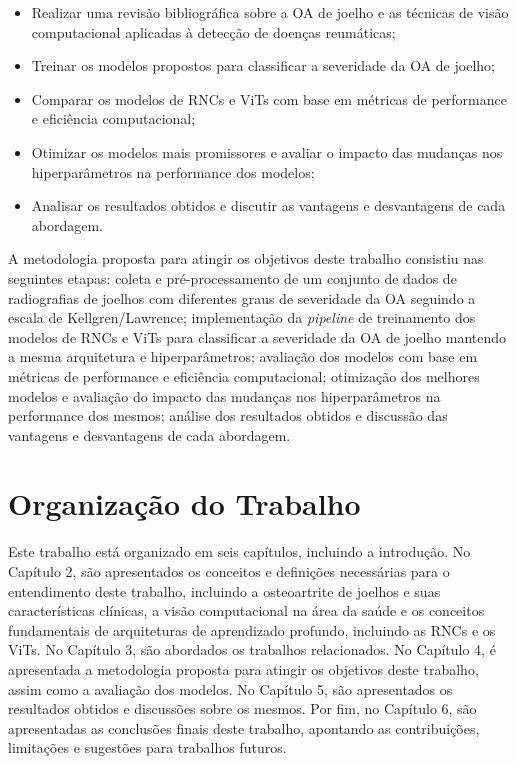\begin{itemize}
    \item Realizar uma revisão bibliográfica sobre a OA de joelho e as técnicas de visão computacional aplicadas à detecção de doenças reumáticas;
    \item Treinar os modelos propostos para classificar a severidade da OA de joelho;
    \item Comparar os modelos de RNCs e ViTs com base em métricas de performance e eficiência computacional;
    \item Otimizar os modelos mais promissores e avaliar o impacto das mudanças nos hiperparâmetros na performance dos modelos;
    \item Analisar os resultados obtidos e discutir as vantagens e desvantagens de cada abordagem.
\end{itemize}

A metodologia proposta para atingir os objetivos deste trabalho consistiu nas seguintes etapas: coleta e pré-processamento de um conjunto de dados de radiografias de joelhos com diferentes graus de severidade da OA seguindo a escala de Kellgren/Lawrence; implementação da \textit{pipeline} de treinamento dos modelos de RNCs e ViTs para classificar a severidade da OA de joelho mantendo a mesma arquitetura e hiperparâmetros; avaliação dos modelos com base em métricas de performance e eficiência computacional; otimização dos melhores modelos e avaliação do impacto das mudanças nos hiperparâmetros na performance dos mesmos; análise dos resultados obtidos e discussão das vantagens e desvantagens de cada abordagem.

\section{Organização do Trabalho}

Este trabalho está organizado em seis capítulos, incluindo a introdução. No Capítulo 2, são apresentados os conceitos e definições necessárias para o entendimento deste trabalho, incluindo a osteoartrite de joelhos e suas características clínicas, a visão computacional na área da saúde e os conceitos fundamentais de arquiteturas de aprendizado profundo, incluindo as RNCs e os ViTs. No Capítulo 3, são abordados os trabalhos relacionados. No Capítulo 4, é apresentada a metodologia proposta para atingir os objetivos deste trabalho, assim como a avaliação dos modelos. No Capítulo 5, são apresentados os resultados obtidos e discussões sobre os mesmos. Por fim, no Capítulo 6, são apresentadas as conclusões finais deste trabalho, apontando as contribuições, limitações e sugestões para trabalhos futuros.